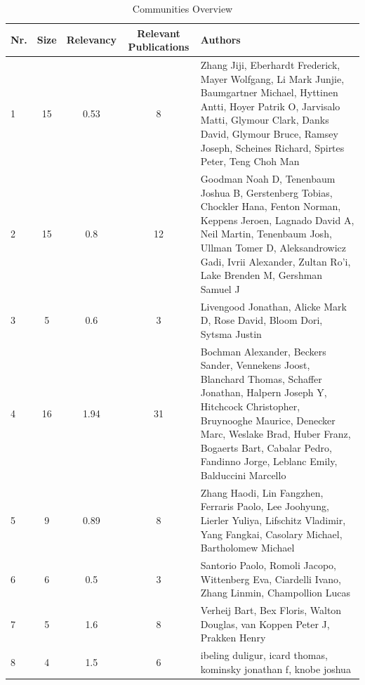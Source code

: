 \documentclass[11pt,a4paper]{book}
\theoremstyle{definition}
\theoremstyle{definition}
\theoremstyle{definition}
\theoremstyle{remark}
\begin{document}
\begin{table}
\centering
\scriptsize
\begin{tabular}{lcccp{6cm}}
\toprule
Nr. & Size & Relevancy & Relevant Publications  & Authors \\
\midrule
1  & 15 & 0.53 & 8 &  Zhang Jiji, Eberhardt Frederick, Mayer Wolfgang, Li Mark Junjie, Baumgartner Michael, Hyttinen Antti, Hoyer Patrik O, Jarvisalo Matti, Glymour Clark, Danks David, Glymour Bruce, Ramsey Joseph, Scheines Richard, Spirtes Peter, Teng Choh Man \\
\midrule
2  &  15 & 0.8 & 12 &  Goodman Noah D, Tenenbaum Joshua B, Gerstenberg Tobias, Chockler Hana, Fenton Norman, Keppens Jeroen, Lagnado David A, Neil Martin, Tenenbaum Josh, Ullman Tomer D, Aleksandrowicz Gadi, Ivrii Alexander, Zultan Ro'i, Lake Brenden M, Gershman Samuel J \\
\midrule
3 &   5 & 0.6 & 3 &  Livengood Jonathan, Alicke Mark D, Rose David, Bloom Dori, Sytsma Justin \\

\midrule
4 & 16 & 1.94 & 31 &  Bochman Alexander, Beckers Sander, Vennekens Joost, Blanchard Thomas, Schaffer Jonathan, Halpern Joseph Y, Hitchcock Christopher, Bruynooghe Maurice, Denecker Marc, Weslake Brad, Huber Franz, Bogaerts Bart, Cabalar Pedro, Fandinno Jorge, Leblanc Emily, Balduccini Marcello \\
\midrule
5 & 9 & 0.89 & 8 &  Zhang Haodi, Lin Fangzhen, Ferraris Paolo, Lee Joohyung, Lierler Yuliya, Lifschitz Vladimir, Yang Fangkai, Casolary Michael, Bartholomew Michael \\

\midrule
6 & 6 & 0.5 & 3 &  Santorio Paolo, Romoli Jacopo, Wittenberg Eva, Ciardelli Ivano, Zhang Linmin, Champollion Lucas \\
\midrule
7 &   5 & 1.6 & 8 &  Verheij Bart, Bex Floris, Walton Douglas, van Koppen Peter J, Prakken Henry \\


\midrule
8 &  4 & 1.5 & 6 &  ibeling duligur, icard thomas, kominsky jonathan f, knobe joshua \\

\bottomrule
\end{tabular}
\caption{Communities Overview}
\label{tab:community_overview}
\end{table}
\end{document}
